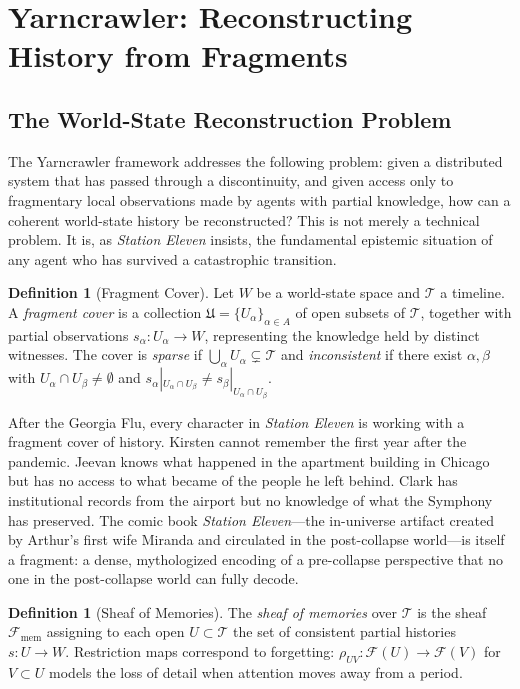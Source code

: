 \documentclass[12pt, oneside]{article}
\theoremstyle{plain}
\theoremstyle{definition}
\newtheorem{definition}[theorem]{Definition}
\theoremstyle{remark}
\newcommand{\Sheaf}{\mathcal{F}}
\newcommand{\covers}{\mathfrak{U}}
\begin{document}
\section{Yarncrawler: Reconstructing History from Fragments}

\subsection{The World-State Reconstruction Problem}

The Yarncrawler framework addresses the following problem: given
a distributed system that has passed through a discontinuity, and
given access only to fragmentary local observations made by agents
with partial knowledge, how can a coherent world-state history be
reconstructed? This is not merely a technical problem. It is, as
\textit{Station Eleven} insists, the fundamental epistemic situation
of any agent who has survived a catastrophic transition.

\begin{definition}[Fragment Cover]
Let $W$ be a world-state space and $\mathcal{T}$ a timeline. A
\emph{fragment cover} is a collection $\covers = \{U_\alpha\}_{\alpha
\in A}$ of open subsets of $\mathcal{T}$, together with partial
observations $s_\alpha : U_\alpha \to W$, representing the knowledge
held by distinct witnesses. The cover is \emph{sparse} if
$\bigcup_\alpha U_\alpha \subsetneq \mathcal{T}$ and
\emph{inconsistent} if there exist $\alpha, \beta$ with $U_\alpha
\cap U_\beta \neq \emptyset$ and $s_\alpha|_{U_\alpha \cap U_\beta}
\neq s_\beta|_{U_\alpha \cap U_\beta}$.
\end{definition}

After the Georgia Flu, every character in \textit{Station Eleven}
is working with a fragment cover of history. Kirsten cannot remember
the first year after the pandemic. Jeevan knows what happened in
the apartment building in Chicago but has no access to what became
of the people he left behind. Clark has institutional records from
the airport but no knowledge of what the Symphony has preserved.
The comic book \textit{Station Eleven}---the in-universe artifact
created by Arthur's first wife Miranda and circulated in the
post-collapse world---is itself a fragment: a dense, mythologized
encoding of a pre-collapse perspective that no one in the post-collapse
world can fully decode.

\begin{definition}[Sheaf of Memories]
The \emph{sheaf of memories} over $\mathcal{T}$ is the sheaf
$\Sheaf_{\mathrm{mem}}$ assigning to each open $U \subset \mathcal{T}$
the set of consistent partial histories $s : U \to W$. Restriction
maps correspond to forgetting: $\rho_{UV} : \Sheaf(U) \to \Sheaf(V)$
for $V \subset U$ models the loss of detail when attention moves
away from a period.
\end{definition}
\end{document}
